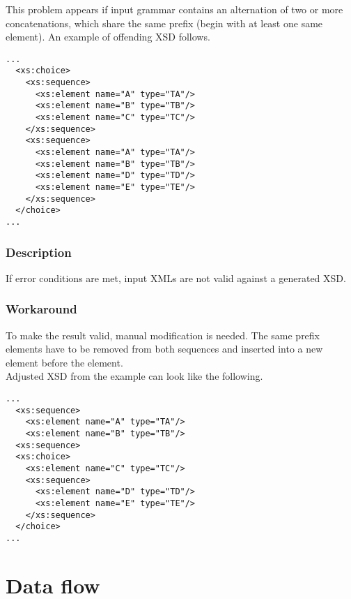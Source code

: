 \documentclass[a4paper,10pt,oneside]{article}
\newcommand{\code}[1]{\texttt{\StrSubstitute{#1}{.}{.\.}}}
\def\.{\discretionary{}{}{}}
\begin{document}
This problem appears if input grammar contains an alternation of two or more concatenations, which share the same prefix (begin with at least one same element). An example of offending XSD follows.

\begin{verbatim}
...
  <xs:choice>
    <xs:sequence>
      <xs:element name="A" type="TA"/>
      <xs:element name="B" type="TB"/>
      <xs:element name="C" type="TC"/>
    </xs:sequence>
    <xs:sequence>
      <xs:element name="A" type="TA"/>
      <xs:element name="B" type="TB"/>
      <xs:element name="D" type="TD"/>
      <xs:element name="E" type="TE"/>
    </xs:sequence>
  </choice>
...
\end{verbatim}

\subsubsection{Description}

If error conditions are met, input XMLs are not valid against a generated XSD.

\subsubsection{Workaround}

To make the result valid, manual modification is needed. The same prefix elements have to be removed from both sequences and inserted into a new \code{<xs:sequence>} element before the \code{<xs:choice>} element.\\

Adjusted XSD from the example can look like the following.
\begin{verbatim}
...
  <xs:sequence>
    <xs:element name="A" type="TA"/>
    <xs:element name="B" type="TB"/>
  <xs:sequence>
  <xs:choice>
    <xs:element name="C" type="TC"/>
    <xs:sequence>
      <xs:element name="D" type="TD"/>
      <xs:element name="E" type="TE"/>
    </xs:sequence>
  </choice>
...
\end{verbatim}

\section{Data flow}
\end{document}
